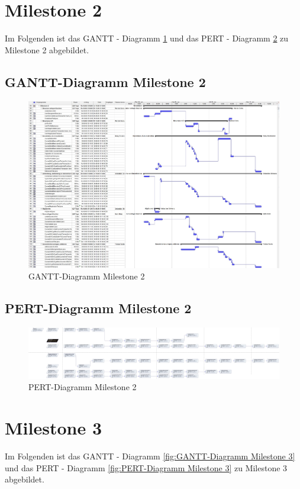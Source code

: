 \section{Milestone 2}
Im Folgenden ist das GANTT - Diagramm \ref{fig:GANTT-Diagramm Milestone 2} und das PERT - Diagramm \ref{fig:PERT-Diagramm Milestone 2} zu Milestone 2 abgebildet.
\subsection{GANTT-Diagramm Milestone 2}
\begin{figure}[h]
	\centering
	\includegraphics[width=1.0\linewidth, angle=90]{Grafiken/Milestone2Gantt}
	\caption{GANTT-Diagramm Milestone 2}
	\label{fig:GANTT-Diagramm Milestone 2}
\end{figure}

\clearpage
\subsection{PERT-Diagramm Milestone 2}
\begin{figure}[h]
	\centering
	\includegraphics[width=1.0\linewidth, angle=90]{Grafiken/Milestone2Pert}
	\caption{PERT-Diagramm Milestone 2}
	\label{fig:PERT-Diagramm Milestone 2}
\end{figure}
\clearpage

\section{Milestone 3}
Im Folgenden ist das GANTT - Diagramm \ref{fig:GANTT-Diagramm Milestone 3} und das PERT - Diagramm \ref{fig:PERT-Diagramm Milestone 3} zu Milestone 3 abgebildet.

